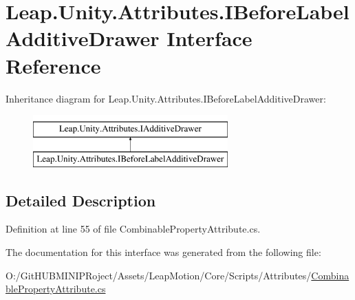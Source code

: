 \hypertarget{interface_leap_1_1_unity_1_1_attributes_1_1_i_before_label_additive_drawer}{}\section{Leap.\+Unity.\+Attributes.\+I\+Before\+Label\+Additive\+Drawer Interface Reference}
\label{interface_leap_1_1_unity_1_1_attributes_1_1_i_before_label_additive_drawer}
Inheritance diagram for Leap.\+Unity.\+Attributes.\+I\+Before\+Label\+Additive\+Drawer\+:\begin{figure}[H]
\begin{center}
\leavevmode
\includegraphics[height=2.000000cm]{interface_leap_1_1_unity_1_1_attributes_1_1_i_before_label_additive_drawer}
\end{center}
\end{figure}


\subsection{Detailed Description}


Definition at line 55 of file Combinable\+Property\+Attribute.\+cs.



The documentation for this interface was generated from the following file\+:\begin{DoxyCompactItemize}
\item 
O\+:/\+Git\+H\+U\+B\+M\+I\+N\+I\+P\+Roject/\+Assets/\+Leap\+Motion/\+Core/\+Scripts/\+Attributes/\mbox{\hyperlink{_combinable_property_attribute_8cs}{Combinable\+Property\+Attribute.\+cs}}\end{DoxyCompactItemize}
